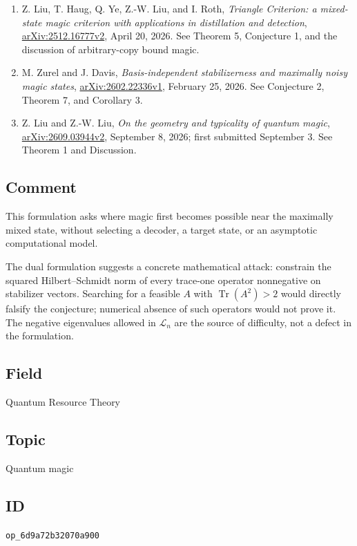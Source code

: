 \begin{enumerate}[label={},leftmargin=4.8em,labelsep=0.5em]
  \footnotesize
  \item[\textup{[Liu26]}]\label{ref:6d9a-liu26}
  Z. Liu, T. Haug, Q. Ye, Z.-W. Liu, and I. Roth, \emph{Triangle Criterion: a mixed-state magic criterion with applications in distillation and detection}, \href{https://arxiv.org/html/2512.16777v2}{arXiv:2512.16777v2}, April 20, 2026. See Theorem 5, Conjecture 1, and the discussion of arbitrary-copy bound magic.

  \item[\textup{[Zurel26]}]\label{ref:6d9a-zurel26}
  M. Zurel and J. Davis, \emph{Basis-independent stabilizerness and maximally noisy magic states}, \href{https://arxiv.org/html/2602.22336v1}{arXiv:2602.22336v1}, February 25, 2026. See Conjecture 2, Theorem 7, and Corollary 3.

  \item[\textup{[LiuLiu26]}]\label{ref:6d9a-liuliu26}
  Z. Liu and Z.-W. Liu, \emph{On the geometry and typicality of quantum magic}, \href{https://arxiv.org/html/2609.03944v2}{arXiv:2609.03944v2}, September 8, 2026; first submitted September 3. See Theorem 1 and Discussion.
\end{enumerate}

\subsection*{Comment}

This formulation asks where magic first becomes possible near the maximally mixed state, without selecting a decoder, a target state, or an asymptotic computational model.

The dual formulation suggests a concrete mathematical attack: constrain the squared Hilbert–Schmidt norm of every trace-one operator nonnegative on stabilizer vectors. Searching for a feasible $A$ with $\operatorname{Tr}(A^2)>2$ would directly falsify the conjecture; numerical absence of such operators would not prove it. The negative eigenvalues allowed in $\mathcal L_n$ are the source of difficulty, not a defect in the formulation.

\subsection*{Field}

Quantum Resource Theory

\subsection*{Topic}

Quantum magic

\subsection*{ID}

\texttt{op\_6d9a72b32070a900}
